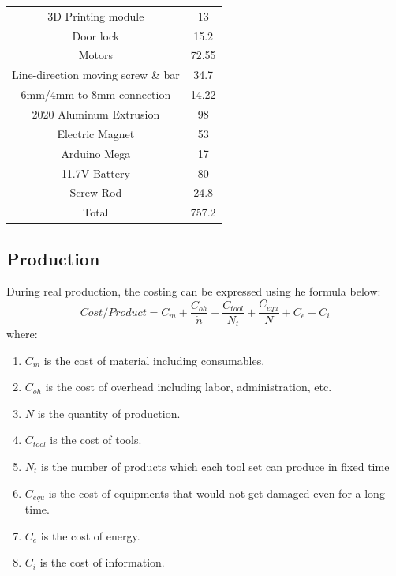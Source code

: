 \documentclass{article}
\begin{document}
\begin{table}[H]
\begin{tabular}{|c|c|c|c|}
\multicolumn{ 2}{|c|}{3D Printing module} & \multicolumn{ 2}{|c|}{13} \\

\multicolumn{ 2}{|c|}{Door lock} & \multicolumn{ 2}{|c|}{15.2} \\

\multicolumn{ 2}{|c|}{Motors} & \multicolumn{ 2}{|c|}{72.55} \\

\multicolumn{ 2}{|c|}{Line-direction moving screw \& bar} & \multicolumn{ 2}{|c|}{34.7} \\

\multicolumn{ 2}{|c|}{6mm/4mm to 8mm connection} & \multicolumn{ 2}{|c|}{14.22} \\

\multicolumn{ 2}{|c|}{2020 Aluminum Extrusion} & \multicolumn{ 2}{|c|}{98} \\

\multicolumn{ 2}{|c|}{Electric Magnet} & \multicolumn{ 2}{|c|}{53} \\

\multicolumn{ 2}{|c|}{Arduino Mega} & \multicolumn{ 2}{|c|}{17} \\

\multicolumn{ 2}{|c|}{11.7V Battery} & \multicolumn{ 2}{|c|}{80} \\

\multicolumn{ 2}{|c|}{Screw Rod} & \multicolumn{ 2}{|c|}{24.8} \\
\hline
\multicolumn{ 2}{|c|}{Total} & \multicolumn{ 2}{|c|}{757.2} \\
\hline
\end{tabular}  


\end{table}

\subsection{Production}
During real production, the costing can be expressed using he formula below:
$$Cost/Product=C_m+\frac{C_{oh}}{\dot{n}}+\frac{C_{tool}}{N_t}+\frac{C_{equ}}{N}+C_e+C_i$$
where:
\begin{enumerate}
\item $C_m$ is the cost of material including consumables.
\item $C_{oh}$ is the cost of overhead including labor, administration, etc.
\item $N$ is the quantity of production.
\item $C_{tool}$ is the cost of tools.
\item $N_t$ is the number of products which each tool set can produce in fixed time
\item $C_{equ}$ is the cost of equipments that would not get damaged even for a long time.
\item $C_e$ is the cost of energy.
\item $C_i$ is the cost of information.
\end{enumerate}
\end{document}

